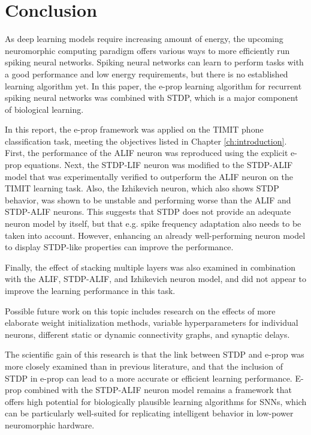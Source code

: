 \chapter{Conclusion}\label{ch:conclusion}

As deep learning models require increasing amount of energy, the upcoming neuromorphic computing paradigm offers various ways to more efficiently run spiking neural networks.
Spiking neural networks can learn to perform tasks with a good performance and low energy requirements, but there is no established learning algorithm yet.
In this paper, the e-prop learning algorithm for recurrent spiking neural networks was combined with STDP, which is a major component of biological learning.

In this report, the e-prop framework was applied on the TIMIT phone classification task, meeting the objectives listed in Chapter \ref{ch:introduction}.
First, the performance of the ALIF neuron was reproduced using the explicit e-prop equations.
Next, the STDP-LIF neuron was modified to the STDP-ALIF model that was experimentally verified to outperform the ALIF neuron on the TIMIT learning task.
Also, the Izhikevich neuron, which also shows STDP behavior, was shown to be unstable and performing worse than the ALIF and STDP-ALIF neurons.
This suggests that STDP does not provide an adequate neuron model by itself, but that e.g. spike frequency adaptation also needs to be taken into account.
However, enhancing an already well-performing neuron model to display STDP-like properties can improve the performance.

Finally, the effect of stacking multiple layers was also examined in combination with the ALIF, STDP-ALIF, and Izhikevich neuron model, and did not appear to improve the learning performance in this task.

Possible future work on this topic includes research on the effects of more elaborate weight initialization methods, variable hyperparameters for individual neurons, different static or dynamic connectivity graphs, and synaptic delays.

The scientific gain of this research is that the link between STDP and e-prop was more closely examined than in previous literature, and that the inclusion of STDP in e-prop can lead to a more accurate or efficient learning performance.
E-prop combined with the STDP-ALIF neuron model remains a framework that offers high potential for biologically plausible learning algorithms for SNNs, which can be particularly well-suited for replicating intelligent behavior in low-power neuromorphic hardware.


